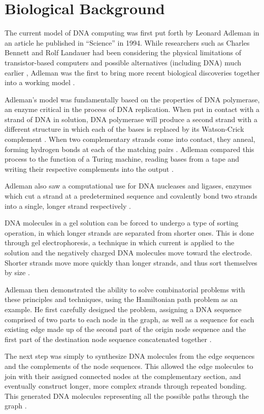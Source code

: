\documentclass[twocolumn]{article}
\begin{document}
\section{Biological Background}
The current model of DNA computing was first put forth by Leonard
Adleman in an article he published in ``Science'' in 1994. While
researchers such as Charles Bennett and Rolf Landauer had been
considering the physical limitations of transistor-based computers and
possible alternatives (including DNA) much earlier \cite{bennett},
Adleman was the
first to bring more recent biological discoveries together into a
working model \cite{adleman_98}.

Adleman's model was fundamentally based on the properties of DNA
polymerase, an enzyme critical in the process of DNA replication. When
put in contact with a strand of DNA in solution, DNA polymerase will
produce a second strand with a different structure in which each of
the bases is replaced by its Watson-Crick complement \cite{watson}. When two
complementary strands come into contact, they anneal, forming hydrogen
bonds at each of the matching pairs \cite{winfree_95}. Adleman compared this
process
to the function of a Turing machine, reading bases from a tape and
writing their respective complements into the output \cite{adleman_98}.

Adleman also saw a computational use for DNA nucleases and ligases,
enzymes which cut a strand at a predetermined sequence and covalently
bond two strands into a single, longer strand respectively \cite{adleman_94}.

DNA molecules in a gel solution can be forced to undergo a type of
sorting operation, in which longer strands are separated from shorter
ones. This is done through gel electrophoresis, a technique in which
current is applied to the solution and the negatively charged DNA
molecules move toward the electrode. Shorter strands move more quickly
than longer strands, and thus sort themselves by size \cite{lodesh}.

Adleman then demonstrated the ability to solve combinatorial problems
with these principles and techniques, using the Hamiltonian path
problem as an example. He first carefully designed the problem,
assigning a DNA sequence comprised of two parts to each node in the
graph, as well as a sequence for each existing edge made up of the
second part of the origin node sequence and the first part of the
destination node sequence concatenated together \cite{adleman_94}.

The next step was simply to synthesize DNA molecules from the edge
sequences and the complements of the node sequences. This allowed the
edge molecules to join with their assigned connected nodes at the
complementary section, and eventually construct longer, more complex
strands through repeated bonding. This generated DNA molecules
representing all the possible paths through the graph \cite{adleman_94}.
\end{document}
